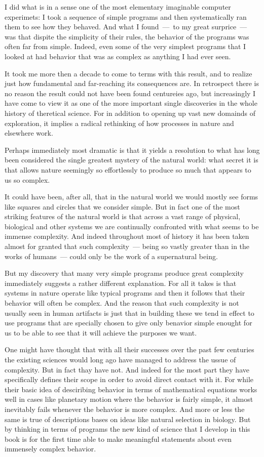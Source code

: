 I did what is in a sense one of the most elementary imaginable
computer experimets: I took a sequence of simple programs and then
systematically ran them to see how they behaved. And what I found\ ---\ 
to my great surprice\ --- was that dispite the simplicity of their rules, the
behavior of the programs was often far from simple. Indeed, even some
of the very simplest programs that I looked at had behavior that was as
complex as anything I had ever seen.

It took me more then a decade to come to terms with this result,
and to realize just how fundamental and far-reaching its consequences
are. In retrospect there is no reason the result could not have been found
centureies ago, but increasingly I have come to view it as one of the more
important single discoveries in the whole history of theretical science.
For in addition to opening up vast new domainds of exploration, it implies
a radical rethinking of how processes in nature and elsewhere work.

Perhaps immediately most dramatic is that it yields a resolution
to what has long been considered the single greatest mystery of the
natural world: what secret it is that allows nature seemingly so
effortlessly to produce so much that appears to us so complex.

It could have been, after all, that in the natural world we would
mostly see forms like squares and circles that we consider simple. But
in fact one of the most striking features of the natural world is that
across a vast range of physical, biological and other systems we are
continually confronted with what seems to be immense complexity.
And indeed throughout most of history it has been taken almost for
granted that such complexity\ --- being so vastly greater than in the works
of humans\ --- could only be the work of a supernatural being.

But my discovery that many very simple programs produce great
complexity immediately suggests a rather different explanation. For all
it takes is that systems in nature operate like typical programs and then
it follows that their behavior will often be complex. And the reason that
such complexity is not usually seen in human artifacts is just that in
building these we tend in effect to use programs that are specially
chosen to give only benavior simple enought for us to be able to see that
it will achieve the purposes we want.

One might have thought that with all their successes over the
past few centuries the existing sciences would long ago have managed
to address the ussue of complexity. But in fact thay have not. And indeed
for the most part they have specifically defines their scope in order to
avoid direct contact with it. For while their basic idea of desciribing
behavior in terms of mathematical equations works well in cases like
planetary motion where the behavior is fairly simple, it almost
inevitably fails whenever the behavior is more complex. And more or
less the same is true of descriptions bases on ideas like natural selection
in biology. But by thinking in terms of programs the new kind of
science that I develop in this book is for the first time able to make
meaningful statements about even immensely complex behavior.

